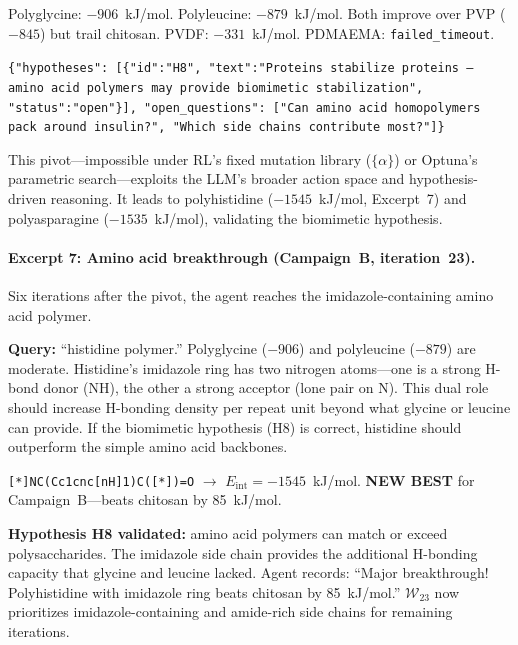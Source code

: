 \documentclass[twocolumn]{fairmeta}
\begin{document}
\begin{toolcall}
\scriptsize
Polyglycine: $-906$~kJ/mol. Polyleucine: $-879$~kJ/mol.
Both improve over PVP ($-845$) but trail chitosan.
PVDF: $-331$~kJ/mol. PDMAEMA: \texttt{failed\_timeout}.
\end{toolcall}

\begin{toolcall}
\scriptsize
\texttt{\{"hypotheses": [\{"id":"H8", "text":"Proteins stabilize proteins -- amino acid polymers may provide biomimetic stabilization", "status":"open"\}], "open\_questions": ["Can amino acid homopolymers pack around insulin?", "Which side chains contribute most?"]\}}
\end{toolcall}

\noindent This pivot---impossible under RL's fixed mutation library ($\{\alpha\}$) or Optuna's parametric search---exploits the LLM's broader action space and hypothesis-driven reasoning.
It leads to polyhistidine ($-1545$~kJ/mol, Excerpt~7) and polyasparagine ($-1535$~kJ/mol), validating the biomimetic hypothesis.

\paragraph{Excerpt 7: Amino acid breakthrough (Campaign~B, iteration~23).}
Six iterations after the pivot, the agent reaches the imidazole-containing amino acid polymer.

\begin{agentthought}
\scriptsize
\textbf{Query:} ``histidine polymer.''
Polyglycine ($-906$) and polyleucine ($-879$) are moderate.
Histidine's imidazole ring has two nitrogen atoms---one is a strong H-bond donor (NH), the other a strong acceptor (lone pair on N).
This dual role should increase H-bonding density per repeat unit beyond what glycine or leucine can provide.
If the biomimetic hypothesis (H8) is correct, histidine should outperform the simple amino acid backbones.
\end{agentthought}

\begin{toolcall}
\scriptsize
\texttt{[*]NC(Cc1cnc[nH]1)C([*])=O} $\to$ $E_\text{int} = -1545$~kJ/mol.
\textbf{NEW BEST} for Campaign~B---beats chitosan by 85~kJ/mol.
\end{toolcall}

\begin{observation}
\scriptsize
\textbf{Hypothesis H8 validated:} amino acid polymers can match or exceed polysaccharides.
The imidazole side chain provides the additional H-bonding capacity that glycine and leucine lacked.
Agent records: ``Major breakthrough! Polyhistidine with imidazole ring beats chitosan by 85~kJ/mol.''
$\mathcal{W}_{23}$ now prioritizes imidazole-containing and amide-rich side chains for remaining iterations.
\end{observation}
\end{document}
